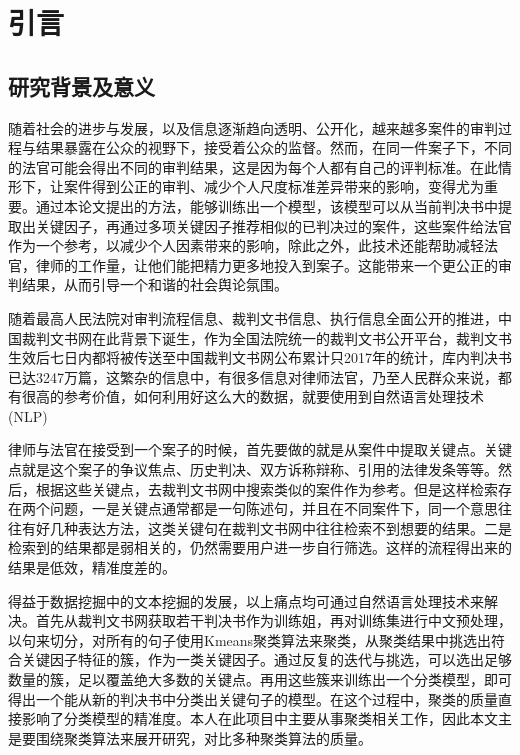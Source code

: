 \section{引言}

\subsection{研究背景及意义}
随着社会的进步与发展，以及信息逐渐趋向透明、公开化，越来越多案件的审判过程与结果暴露在公众的视野下，接受着公众的监督。然而，在同一件案子下，不同的法官可能会得出不同的审判结果，这是因为每个人都有自己的评判标准。在此情形下，让案件得到公正的审判、减少个人尺度标准差异带来的影响，变得尤为重要。通过本论文提出的方法，能够训练出一个模型，该模型可以从当前判决书中提取出关键因子，再通过多项关键因子推荐相似的已判决过的案件，这些案件给法官作为一个参考，以减少个人因素带来的影响，除此之外，此技术还能帮助减轻法官，律师的工作量，让他们能把精力更多地投入到案子。这能带来一个更公正的审判结果，从而引导一个和谐的社会舆论氛围。

随着最高人民法院对审判流程信息、裁判文书信息、执行信息全面公开的推进，中国裁判文书网在此背景下诞生，作为全国法院统一的裁判文书公开平台，裁判文书生效后七日内都将被传送至中国裁判文书网公布累计只2017年的统计，库内判决书已达3247万篇\cite{WEB:judgement}，这繁杂的信息中，有很多信息对律师法官，乃至人民群众来说，都有很高的参考价值，如何利用好这么大的数据，就要使用到自然语言处理技术(NLP)

律师与法官在接受到一个案子的时候，首先要做的就是从案件中提取关键点。关键点就是这个案子的争议焦点、历史判决、双方诉称辩称、引用的法律发条等等。然后，根据这些关键点，去裁判文书网中搜索类似的案件作为参考。但是这样检索存在两个问题，一是关键点通常都是一句陈述句，并且在不同案件下，同一个意思往往有好几种表达方法，这类关键句在裁判文书网中往往检索不到想要的结果。二是检索到的结果都是弱相关的，仍然需要用户进一步自行筛选。这样的流程得出来的结果是低效，精准度差的。

得益于数据挖掘中的文本挖掘的发展，以上痛点均可通过自然语言处理技术来解决。首先从裁判文书网获取若干判决书作为训练姐，再对训练集进行中文预处理，以句来切分，对所有的句子使用Kmeans聚类算法来聚类，从聚类结果中挑选出符合关键因子特征的簇，作为一类关键因子。通过反复的迭代与挑选，可以选出足够数量的簇，足以覆盖绝大多数的关键点。再用这些簇来训练出一个分类模型，即可得出一个能从新的判决书中分类出关键句子的模型。在这个过程中，聚类的质量直接影响了分类模型的精准度。本人在此项目中主要从事聚类相关工作，因此本文主是要围绕聚类算法来展开研究，对比多种聚类算法的质量。

